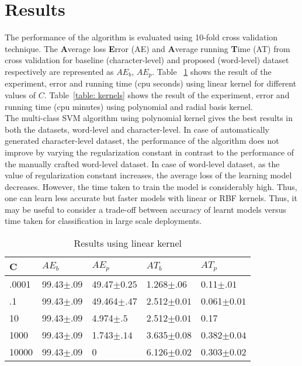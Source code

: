 \documentclass{acm_proc_article-sp}
\begin{document}
\section{Results}
 The performance of the algorithm is evaluated using 10-fold cross validation technique. The \textbf{A}verage loss \textbf{E}rror (AE) and  \textbf{A}verage running \textbf{T}ime (AT) from cross validation for baseline (character-level) and proposed (word-level) dataset respectively are represented as $AE_{b}$, $AE_{p}$. Table ~\ref{table: errors} shows the result of the experiment, error and running time (cpu seconds) using linear kernel for different values of $C$. Table~\ref{table: kernels} shows the result of the experiment, error and running time (cpu minutes) using polynomial and radial basis kernel.\\
The multi-class SVM algorithm using polynomial kernel gives the best results in both the datasets, word-level and character-level. In case of automatically generated character-level dataset, the performance of the algorithm does not improve by varying the regularization constant in contrast to the performance of the manually crafted word-level dataset. In case of word-level dataset, as the value of regularization constant increases, the average loss of the learning model decreases. However, the time taken to train the model is considerably high. Thus, one can learn less accurate but faster models with linear or RBF kernels. Thus, it may be useful to consider a trade-off between accuracy of learnt models versus time taken for classification in large scale deployments.
\begin{table}[htdp]
\centering
\caption{Results using linear kernel}
\begin{tabular}{|lllll|}
\hline
C &$AE_{b}$&$AE_{p}$&$AT_{b}$&$AT_{p}$\\
\hline
.0001&99.43$\pm .09$&49.47$\pm0.25$&1.268$\pm.06$&0.11$\pm.01$\\
.1&99.43$\pm .09$&49.464$\pm .47$&2.512$\pm0.01$&0.061$\pm0.01$\\
10&99.43$\pm .09$&4.974$\pm .5$&2.512$\pm0.01$&0.17\\
1000&99.43$\pm .09$&1.743$\pm .14$&3.635$\pm0.08$&0.382$\pm0.04$\\
10000&99.43$\pm .09$&0&6.126$\pm0.02$&0.303$\pm0.02$\\
\hline
\end{tabular}
\label{table: errors}
\end{table}
\vspace{-2em}
\end{document}
